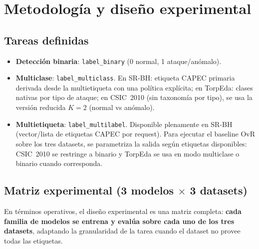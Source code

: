 \documentclass[12pt,oneside]{report}
\begin{document}
\chapter{Metodología y diseño experimental}

\section{Tareas definidas}
\begin{itemize}[leftmargin=*]
  \item \textbf{Detección binaria}: \texttt{label\_binary} (0 normal, 1 ataque/anómalo).
  \item \textbf{Multiclase}: \texttt{label\_multiclass}. En SR-BH: etiqueta CAPEC primaria derivada desde la multietiqueta con una política explícita; en TorpEda: clases nativas por tipo de ataque; en CSIC~2010 (sin taxonomía por tipo), se usa la versión reducida $K=2$ (normal vs anómalo).
  \item \textbf{Multietiqueta}: \texttt{label\_multilabel}. Disponible plenamente en SR-BH (vector/lista de etiquetas CAPEC por request). Para ejecutar el baseline OvR sobre los tres datasets, se parametriza la salida según etiquetas disponibles: CSIC~2010 se restringe a binario y TorpEda se usa en modo multiclase o binario cuando corresponda.
\end{itemize}

\section{Matriz experimental (3 modelos $\times$ 3 datasets)}
En términos operativos, el diseño experimental es una matriz completa: \textbf{cada familia de modelos se entrena y evalúa sobre cada uno de los tres datasets}, adaptando la granularidad de la tarea cuando el dataset no provee todas las etiquetas.
\end{document}
